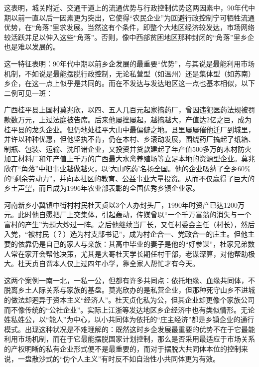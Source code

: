 \documentclass[a4paper,12pt,punct=kaiming,fontset=none]{ctexart}
\begin{document}
这表明，城关附近、交通干道上的流通优势与行政控制优势这两因素中，90年代中期以前一直以后一因素更为突出，它使得“农民企业”为回避行政控制宁可牺牲流通优势，在“角落”里求发展。当然这有个条件，即整个大地区经济较发达，市场网络较活跃并足以伸入这些“角落”。否则，像中西部贫困地区那种封闭的“角落”里乡企也是难以发展的。

这一特征表明：90年代中期以前乡企发展的最重要“优势”，与其说是最能利用市场机制，不如说是最能摆脱行政控制，无论私营型（如温州）还是集体型（如苏南）乡企，在这一点上似乎是共同的。而在不发达与发达地区这一点也基本相似，以下二例可见一斑：

广西桂平县上国村莫兆欣，以四、五人几百元起家搞药厂，曾因违犯医药法规被罚款数万元，上过法庭被告席。后来他屡挫屡起，越搞越大，产值达2亿之巨，成为桂平县的龙头企业。但仍地处桂平大山中最偏僻之地。县里屡屡催他迁厂到城里，并许以种种优惠，但他坚执不肯，仍在本村、乡滚动发展，围绕药厂搞起了纸箱、制瓶、包装、运输、洗印诸企业，又投资并贷款建起了年产值500多万的木材防火加工材料厂和年产值上千万的广西最大水禽养殖场等立足本地的资源型企业。莫兆欣在“角落”中把事业越做越火，以‘大山吃药’名扬全国。他的企业吸纳了全乡60\%的“剩余劳动力”，并向本社区的教育、公益事业大量投资。从而不仅赢得了巨大的乡土声望，而且成为1996年农业部表彰的全国优秀乡镇企业家。

河南新乡小冀镇中街村村民杜天贞以3个人办封头厂，1990年时资产已达1200万元。此时他自愿把厂上交集体，引起轰动，传媒曾以“一个千万富翁的消失与一个富村的产生”为题大炒过一阵。之后他继续当厂长，又任村委会主任（村长），然后入党，“被村民（？）选为村支部书记”，成为村企合一、党政合一的庄主。但他主要的依靠仍是自己的家人与亲族：其高中毕业的妻子是他的“好参谋”，杜家兄弟数人常在家开会帮他决策，尤其是大哥杜天学长期任村干部，老谋深算，对他帮助极大。杜天贞自谓本人仅上过四年小学，靠全家人帮忙才有今天。

这两个案例一南一北，一私一公，但都有许多共同点：依托地缘、血缘共同体，不脱离乡土人际关系与家族的基盘。莫兆欣办的是私营企业，但那种死守山乡不进城的做法却迥异于资本主义“经济人”。杜天贞化私为公，但其企业却更像个家族公司而不像传统的“公社企业”。实际上江浙等发达地区乡企经济中也有类似情形。无论姓私姓公，以“能人”为中心，以小共同体为依托的“庄主经济”都是乡镇企业的通行模式。出现这种状况是不难理解的：既然这时乡企发展最重要的优势不在于它最能利用市场机制，而在于它最能摆脱国家计划控制，那么是否采用最适应于市场关系的产权明晰的私有企业形式便不是最重要的，而对于摆脱大共同体本位的控制来说，一盘散沙式的“伪个人主义”有时反不如自治性小共同体更为有效。
\end{document}
